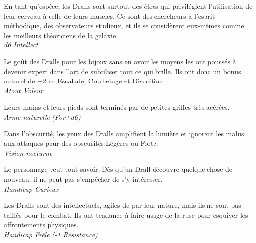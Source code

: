 \begin{description}[align=left]
\item[Soif de connaissance]    %
 	En tant qu’espèce, les Dralls sont surtout des êtres qui privilégient l’utilisation de leur cerveau à celle de leurs muscles. Ce sont des chercheurs à l’esprit méthodique, des observateurs studieux, et ils se considèrent eux-mêmes comme les meilleurs théoriciens de la galaxie. \\
 	\textit{d6 Intellect}

\item[Arsène Félin]    %
 	Le goût des Dralls pour les bijoux sans en avoir les moyens les ont poussés à devenir expert dans l’art de subtiliser tout ce qui brille. Ils ont donc un bonus naturel de +2 en Escalade, Crochetage et Discrétion \\
 	\textit{Atout Voleur}
 	
\item[Griffes rétractables]    %
	Leurs mains et leurs pieds sont terminés par de petites griffes très acérées.\\
	\textit{Arme naturelle (For+d6)}\\
    
\item[Vision Nocturne]  %
	Dans l’obscurité, les yeux des Dralls amplifient la lumière et ignorent les malus aux attaques pour des obscurités Légères ou Forte.\\
	\textit{Vision nocturne}\\

\item[Mourir moins bête]       %
 	Le personnage veut tout savoir. Dès qu’un Drall découvre quelque chose de nouveau, il ne peut pas s’empêcher de s’y intéresser.\\
    \textit{Handicap Curieux} \\

\item[Frêle]       				%
 	Les Dralls sont des intellectuels, agiles de par leur nature, mais ils ne sont pas taillés pour le combat. Ils ont tendance à faire usage de la ruse pour esquiver les affrontements physiques.\\
    \textit{Handicap Frêle (-1 Résistance)}
\end{description}

